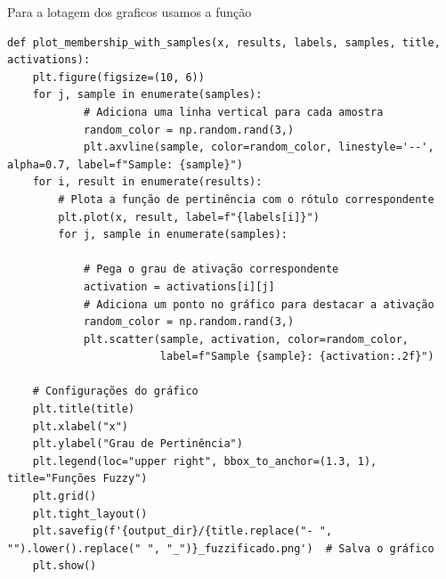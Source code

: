\documentclass[a4paper,12pt]{article}
\begin{document}
Para a lotagem dos graficos usamos a função 
\begin{verbatim}
def plot_membership_with_samples(x, results, labels, samples, title, activations):
    plt.figure(figsize=(10, 6))
    for j, sample in enumerate(samples):
            # Adiciona uma linha vertical para cada amostra
            random_color = np.random.rand(3,)
            plt.axvline(sample, color=random_color, linestyle='--', alpha=0.7, label=f"Sample: {sample}")
    for i, result in enumerate(results):
        # Plota a função de pertinência com o rótulo correspondente
        plt.plot(x, result, label=f"{labels[i]}")
        for j, sample in enumerate(samples):
           
            # Pega o grau de ativação correspondente
            activation = activations[i][j]
            # Adiciona um ponto no gráfico para destacar a ativação
            random_color = np.random.rand(3,)
            plt.scatter(sample, activation, color=random_color, 
                        label=f"Sample {sample}: {activation:.2f}")

    # Configurações do gráfico
    plt.title(title)
    plt.xlabel("x")
    plt.ylabel("Grau de Pertinência")
    plt.legend(loc="upper right", bbox_to_anchor=(1.3, 1), title="Funções Fuzzy")
    plt.grid()
    plt.tight_layout()
    plt.savefig(f'{output_dir}/{title.replace("- ", "").lower().replace(" ", "_")}_fuzzificado.png')  # Salva o gráfico
    plt.show()
\end{verbatim}
\end{document}
